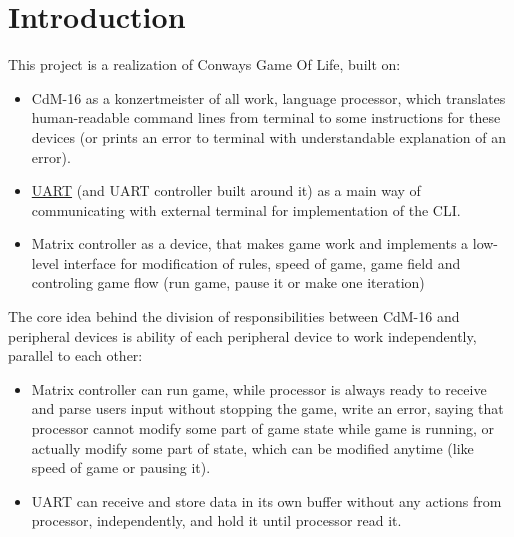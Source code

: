 \chapter*{Introduction}

This project is a realization of Conways Game Of Life, built on:

\begin{itemize}
	\item CdM-16 as a konzertmeister of all work, language processor, which translates human-readable command lines from terminal to some instructions for these devices (or prints an error to terminal with understandable explanation of an error).
	\item \href{https://github.com/cdm-processors/logisim-uart}{UART} (and UART controller built around it) as a main way of communicating with external terminal for implementation of the CLI.
	\item Matrix controller as a device, that makes game work and implements a low-level interface for modification of rules, speed of game, game field and controling game flow (run game, pause it or make one iteration)
\end{itemize}

The core idea behind the division of responsibilities between CdM-16 and peripheral devices is ability of each peripheral device to work independently, parallel to each other:

\begin{itemize}
	\item Matrix controller can run game, while processor is always ready to receive and parse users input without stopping the game, write an error, saying that processor cannot modify some part of game state while game is running, or actually modify some part of state, which can be modified anytime (like speed of game or pausing it).
	\item UART can receive and store data in its own buffer without any actions from processor, independently, and hold it until processor read it.
\end{itemize}
